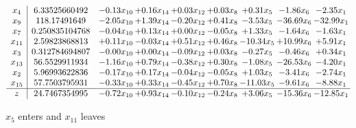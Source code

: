 \documentclass[9pt]{article}
\begin{document}
 \[\begin{array}{c| c c@{\hskip 2pt} c@{\hskip 2pt} c@{\hskip 2pt} c@{\hskip 2pt} c@{\hskip 2pt} c@{\hskip 2pt} c@{\hskip 2pt} }
 x_{4}   &  6.33525660492 & -0.13 x_{10} & +  0.16 x_{14} & +  0.03 x_{12} & +  0.03 x_{8} & +  0.31 x_{5} & -1.86 x_{6} & -2.35 x_{1}\\
 x_{9}   &  118.17491649 & -2.05 x_{10} & +  1.39 x_{14} & -0.20 x_{12} & +  0.41 x_{8} & -3.53 x_{5} & -36.69 x_{6} & -32.99 x_{1}\\
 x_{7}   &  0.250835104768 & -0.04 x_{10} & +  0.13 x_{14} & +  0.00 x_{12} & -0.05 x_{8} & +  1.33 x_{5} & -1.64 x_{6} & -1.63 x_{1}\\
 x_{11}   &  2.59823868813 & +  0.11 x_{10} & -0.03 x_{14} & +  0.51 x_{12} & +  0.46 x_{8} & -10.34 x_{5} & + 10.99 x_{6} & +  5.91 x_{1}\\
 x_{3}   &  0.312784694807 & -0.00 x_{10} & +  0.00 x_{14} & -0.09 x_{12} & +  0.03 x_{8} & -0.27 x_{5} & -0.46 x_{6} & +  0.34 x_{1}\\
 x_{13}   &  56.5529911934 & -1.16 x_{10} & +  0.79 x_{14} & -0.38 x_{12} & +  0.30 x_{8} & -1.08 x_{5} & -26.53 x_{6} & -4.20 x_{1}\\
 x_{2}   &  5.96993622836 & -0.17 x_{10} & +  0.17 x_{14} & -0.04 x_{12} & -0.05 x_{8} & +  1.03 x_{5} & -3.41 x_{6} & -2.74 x_{1}\\
 x_{15}   &  57.7503795931 & -0.33 x_{10} & +  0.33 x_{14} & -0.45 x_{12} & +  0.70 x_{8} & -11.03 x_{5} & -9.61 x_{6} & -8.88 x_{1}\\
\hline
z    &  24.7467354995 & -0.72 x_{10} & +  0.93 x_{14} & -0.10 x_{12} & -0.24 x_{8} & +  3.06 x_{5} & -15.36 x_{6} & -12.85 x_{1}\\
\end{array}\]


 $ x_{5} $ enters and $ x_{11} $ leaves 
\end{document}
